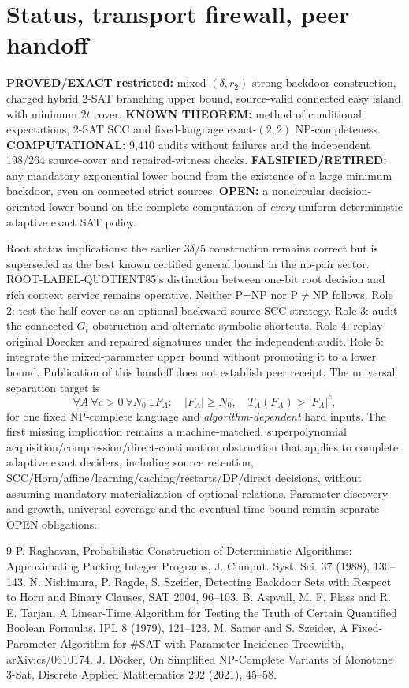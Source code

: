 \documentclass[11pt]{article}
\begin{document}
\section{Status, transport firewall, peer handoff}
\textbf{PROVED/EXACT restricted:} mixed $(\delta,r_2)$ strong-backdoor construction, charged hybrid 2-SAT branching upper bound, source-valid connected easy island with minimum $2t$ cover. \textbf{KNOWN THEOREM:} method of conditional expectations, 2-SAT SCC and fixed-language exact-$(2,2)$ NP-completeness. \textbf{COMPUTATIONAL:} 9,410 audits without failures and the independent 198/264 source-cover and repaired-witness checks. \textbf{FALSIFIED/RETIRED:} any mandatory exponential lower bound from the existence of a large minimum backdoor, even on connected strict sources. \textbf{OPEN:} a noncircular decision-oriented lower bound on the complete computation of \emph{every} uniform deterministic adaptive exact SAT policy.

Root status implications: the earlier $3\delta/5$ construction remains correct but is superseded as the best known certified general bound in the no-pair sector. ROOT-LABEL-QUOTIENT85's distinction between one-bit root decision and rich context service remains operative. Neither P=NP nor P$\ne$NP follows. Role 2: test the half-cover as an optional backward-source SCC strategy. Role 3: audit the connected $G_t$ obstruction and alternate symbolic shortcuts. Role 4: replay original Doecker and repaired signatures under the independent audit. Role 5: integrate the mixed-parameter upper bound without promoting it to a lower bound. Publication of this handoff does not establish peer receipt.
The universal separation target is
\[
\forall A\ \forall c>0\ \forall N_0\ \exists F_A:
\quad |F_A|\ge N_0,\quad T_A(F_A)>|F_A|^c ,
\]
for one fixed NP-complete language and \emph{algorithm-dependent} hard inputs. The first missing implication remains a machine-matched, superpolynomial acquisition/compression/direct-continuation obstruction that applies to complete adaptive exact deciders, including source retention, SCC/Horn/affine/learning/caching/restarts/DP/direct decisions, without assuming mandatory materialization of optional relations. Parameter discovery and growth, universal coverage and the eventual time bound remain separate OPEN obligations.
\begin{thebibliography}{9}
 P. Raghavan, Probabilistic Construction of Deterministic Algorithms: Approximating Packing Integer Programs, J. Comput. Syst. Sci. 37 (1988), 130--143.
 N. Nishimura, P. Ragde, S. Szeider, Detecting Backdoor Sets with Respect to Horn and Binary Clauses, SAT 2004, 96--103.
 B. Aspvall, M. F. Plass and R. E. Tarjan, A Linear-Time Algorithm for Testing the Truth of Certain Quantified Boolean Formulas, IPL 8 (1979), 121--123.
 M. Samer and S. Szeider, A Fixed-Parameter Algorithm for \#SAT with Parameter Incidence Treewidth, arXiv:cs/0610174.
 J. D\"ocker, On Simplified NP-Complete Variants of Monotone 3-Sat, Discrete Applied Mathematics 292 (2021), 45--58.
\end{thebibliography}
\end{document}
